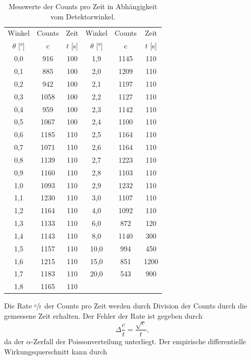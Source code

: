 \begin{table}[H]
  \centering
  \begin{tabular}{ccc|ccc}
    \toprule
    Winkel & Counts & Zeit & Winkel & Counts & Zeit \\
    $\theta$ [°] & c & $t$ [s] & $\theta$ [°] & c & $t$ [s] \\
    \midrule
    0,0 &  916 & 100 &  1,9 & 1145 & 110  \\
    0,1 &  885 & 100 &  2,0 & 1209 & 110  \\
    0,2 &  942 & 100 &  2,1 & 1197 & 110  \\
    0,3 & 1058 & 100 &  2,2 & 1127 & 110  \\
    0,4 &  959 & 100 &  2,3 & 1142 & 110  \\
    0,5 & 1067 & 100 &  2,4 & 1100 & 110  \\
    0,6 & 1185 & 110 &  2,5 & 1164 & 110  \\
    0,7 & 1071 & 110 &  2,6 & 1164 & 110  \\
    0,8 & 1139 & 110 &  2,7 & 1223 & 110  \\
    0,9 & 1160 & 110 &  2,8 & 1103 & 110  \\
    1,0 & 1093 & 110 &  2,9 & 1232 & 110  \\
    1,1 & 1230 & 110 &  3,0 & 1107 & 110  \\
    1,2 & 1164 & 110 &  4,0 & 1092 & 110  \\
    1,3 & 1133 & 110 &  6,0 &  872 & 120  \\
    1,4 & 1143 & 110 &  8,0 & 1140 & 300  \\
    1,5 & 1157 & 110 & 10,0 &  994 & 450  \\
    1,6 & 1215 & 110 & 15,0 &  851 & 1200 \\
    1,7 & 1183 & 110 & 20,0 &  543 & 900  \\
    1,8 & 1165 & 110 &                    \\
    \bottomrule
  \end{tabular}
  \caption{Messwerte der Counts pro Zeit in Abhängigkeit vom Detektorwinkel.}
  \label{tab:WQ}
\end{table}
Die Rate $\sfrac{c}{t}$ der Counts pro Zeit werden durch Division der Counts durch die gemessene Zeit erhalten.
Der Fehler der Rate ist gegeben durch
\begin{equation}
  \Delta{\frac{c}{t}} = {\frac{\sqrt{c}}{t}},
\end{equation}
da der $\alpha$-Zerfall der Poissonverteilung unterliegt.
Der empirische differentielle Wirkungsquerschnitt kann durch

